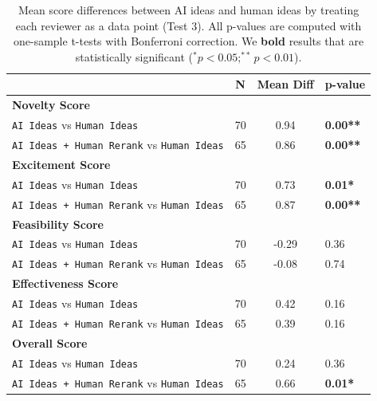 \begin{table}[t]
\centering
\begin{tabular}{l c c l} 
 \hline
 & N & Mean Diff & p-value \\
 \hline 
 \textbf{Novelty Score} \\
 \texttt{AI Ideas} vs \texttt{Human Ideas} & 70 & 0.94 & \textbf{0.00**} \\
 \texttt{AI Ideas + Human Rerank} vs \texttt{Human Ideas} & 65 & 0.86 & \textbf{0.00**} \\
 \hline 
 \textbf{Excitement Score} \\
 \texttt{AI Ideas} vs \texttt{Human Ideas} & 70 & 0.73 & \textbf{0.01*} \\
 \texttt{AI Ideas + Human Rerank} vs \texttt{Human Ideas} & 65 & 0.87 & \textbf{0.00**} \\
 \hline 
 \textbf{Feasibility Score} \\
 \texttt{AI Ideas} vs \texttt{Human Ideas} & 70 & -0.29 & 0.36 \\
 \texttt{AI Ideas + Human Rerank} vs \texttt{Human Ideas} & 65 & -0.08 & 0.74 \\
 \hline 
 \textbf{Effectiveness Score} \\
 \texttt{AI Ideas} vs \texttt{Human Ideas} & 70 & 0.42 & 0.16 \\
 \texttt{AI Ideas + Human Rerank} vs \texttt{Human Ideas} & 65 & 0.39 & 0.16 \\
 \hline
 \textbf{Overall Score} \\
 \texttt{AI Ideas} vs \texttt{Human Ideas} & 70 & 0.24 & 0.36 \\ 
 \texttt{AI Ideas + Human Rerank} vs \texttt{Human Ideas} & 65 & 0.66 & \textbf{0.01*} \\
 \hline
\end{tabular}
\caption{Mean score differences between AI ideas and human ideas by treating each reviewer as a data point (Test 3). All p-values are computed with one-sample t-tests with Bonferroni correction. We \textbf{bold} results that are statistically significant ($^*p<0.05; ^{**}p<0.01$).}
\label{table:results_per_reviewer}
\end{table}




